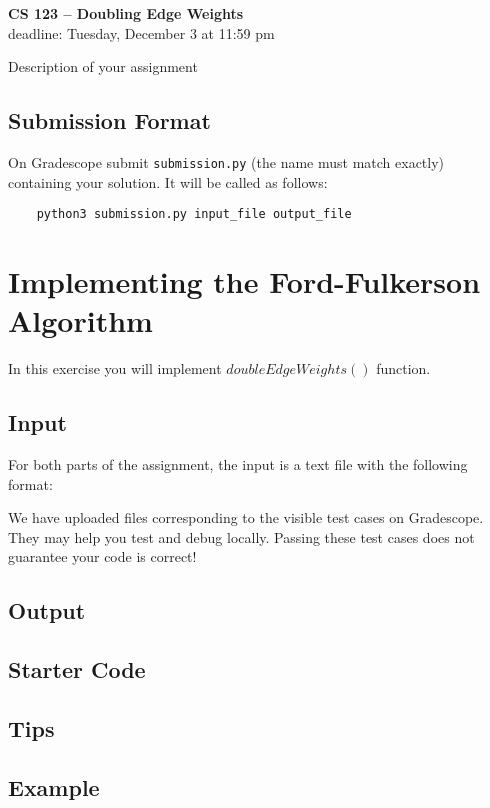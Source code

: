 \documentclass[11pt]{article}
\begin{document}
\begin{center}
\Large{\textbf{CS 123 -- Doubling Edge Weights}}\\
\Large{deadline: Tuesday, December 3 at 11:59 pm}
\end{center}

Description of your assignment
\subsection*{Submission Format}

On Gradescope submit {\tt submission.py}  (the name must match exactly)  containing your solution.
It will be called as follows: 

\begin{verbatim}
	python3 submission.py input_file output_file
\end{verbatim}
\section{Implementing the Ford-Fulkerson Algorithm}

In this exercise you will implement $doubleEdgeWeights()$ function.

\subsection*{Input}

For both parts of the assignment, the input is a text file with the following format: 

We have uploaded files corresponding to the visible test cases on Gradescope.
They may help you test and debug locally.
Passing these test cases does not guarantee your code is correct!

\subsection*{Output}

\subsection*{Starter Code}

\subsection*{Tips}

\subsection*{Example}
\end{document}
